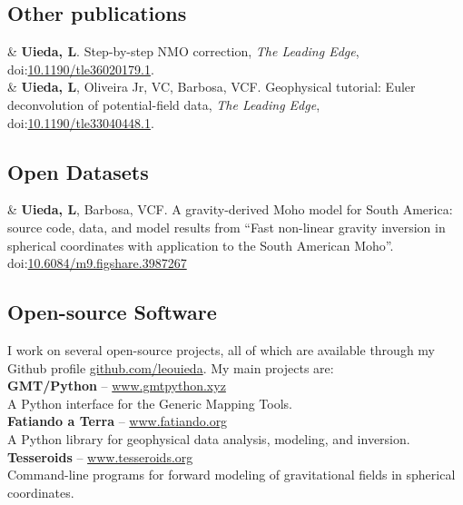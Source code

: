 \documentclass[11pt, a4paper]{article}
\newcommand{\LastName}{Uieda}
\newcommand{\Initials}{L}
\newcommand{\Me}{\textbf{\LastName, \Initials}}  %
\newcommand{\Val}{Barbosa, VCF}
\newcommand{\Bi}{Oliveira Jr, VC}
\newcommand{\DOI}[1]{doi:\href{https://doi.org/#1}{#1}}
\newcommand{\Year}[1]{\fontsize{10pt}{0}\selectfont #1}
\begin{document}
\subsection*{Other publications}

\begin{EntriesTable}
\Year{2017}  &
    \Me.
    Step-by-step NMO correction,
    \emph{The Leading Edge},
    \DOI{10.1190/tle36020179.1}.
    \\
\Year{2014}  &
    \Me, \Bi, \Val.
    Geophysical tutorial: Euler deconvolution of potential-field data,
    \emph{The Leading Edge},
    \DOI{10.1190/tle33040448.1}.
\end{EntriesTable}


\subsection*{Open Datasets}

\begin{EntriesTable}
\Year{2017}  &
    \Me, \Val.
    A gravity-derived Moho model for South America: source code, data, and
    model results from ``Fast non-linear gravity inversion in spherical
    coordinates with application to the South American Moho''.
    \DOI{10.6084/m9.figshare.3987267}
\end{EntriesTable}


\subsection*{Open-source Software}

I work on several open-source projects, all of which are available through
my Github profile
\href{https://github.com/leouieda/}{github.com/leouieda}.
My main projects are:
\\[0.4cm]
\textbf{GMT/Python} -- \href{http://www.gmtpython.xyz}{www.gmtpython.xyz}
\\
A Python interface for the Generic Mapping Tools.
\\[0.3cm]
\textbf{Fatiando a Terra} -- \href{http://www.fatiando.org}{www.fatiando.org}
\\
A Python library for geophysical data analysis, modeling, and
inversion.
\\[0.3cm]
\textbf{Tesseroids} -- \href{http://www.tesseroids.org}{www.tesseroids.org}
\\
Command-line programs for forward modeling of gravitational fields in
spherical coordinates.
\end{document}
